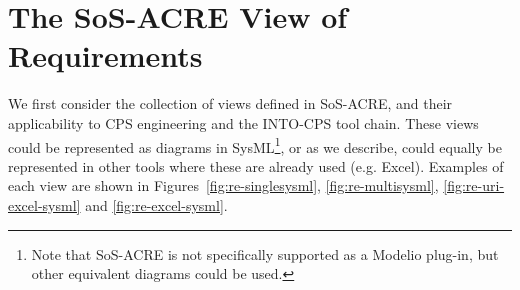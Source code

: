 

\section{The SoS-ACRE View of Requirements}

We first consider the collection of views defined in SoS-ACRE, and their applicability to CPS engineering and the INTO-CPS tool chain. These views could be represented as diagrams in SysML\footnote{Note that SoS-ACRE is not specifically supported as a Modelio plug-in, but other equivalent diagrams could be used.}, or as we describe, could equally be represented in other tools where these are already used (e.g. Excel). Examples of each view are shown in Figures~\ref{fig:re-singlesysml}, \ref{fig:re-multisysml}, \ref{fig:re-uri-excel-sysml} and \ref{fig:re-excel-sysml}. %


